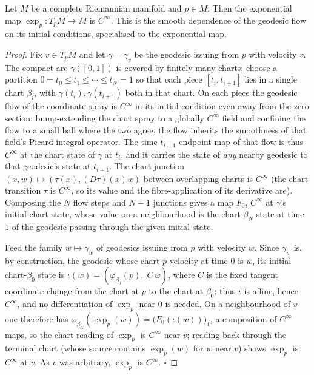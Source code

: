 \begin{lemma}
  \label{lem:dc-ch7-3-expmap-smooth}
  \leanok
  Let $M$ be a complete Riemannian manifold and $p\in M$. Then the exponential map
  $\exp_p:T_pM\to M$ is $C^\infty$. This is the smooth dependence of the geodesic flow on its
  initial conditions, specialised to the exponential map.
\end{lemma}
\begin{proof}
  \leanok
  Fix $v\in T_pM$ and let $\gamma=\gamma_v$ be the geodesic issuing from $p$ with velocity
  $v$. The compact arc $\gamma([0,1])$ is covered by finitely many charts; choose a partition
  $0=t_0\le t_1\le\cdots\le t_N=1$ so that each piece $[t_i,t_{i+1}]$ lies in a single chart
  $\beta_i$, with $\gamma(t_i),\gamma(t_{i+1})$ both in that chart. On each piece the geodesic
  flow of the coordinate spray is $C^\infty$ in its initial condition even away from the zero
  section: bump-extending the chart spray to a globally $C^\infty$ field and confining the
  flow to a small ball where the two agree, the flow inherits the smoothness of that field's
  Picard integral operator. The time-$t_{i+1}$ endpoint map of that flow is thus $C^\infty$ at
  the chart state of $\gamma$ at $t_i$, and it carries the state of \emph{any} nearby geodesic
  to that geodesic's state at $t_{i+1}$. The chart junction $(x,w)\mapsto(\tau(x),(D\tau)(x)w)$
  between overlapping charts is $C^\infty$ (the chart transition $\tau$ is $C^\infty$, so its
  value and the fibre-application of its derivative are). Composing the $N$ flow steps and
  $N-1$ junctions gives a map $F_0$, $C^\infty$ at $\gamma$'s initial chart state, whose value
  on a neighbourhood is the chart-$\beta_N$ state at time $1$ of the geodesic passing through
  the given initial state.

  Feed the family $w\mapsto\gamma_w$ of geodesics issuing from $p$ with velocity $w$. Since
  $\gamma_w$ is, by construction, the geodesic whose chart-$p$ velocity at time $0$ is $w$, its
  initial chart-$\beta_0$ state is $\iota(w)=(\varphi_{\beta_0}(p),\;C\,w)$, where
  $C$ is the fixed tangent coordinate change from the chart at $p$ to the chart at $\beta_0$;
  thus $\iota$ is affine, hence $C^\infty$, and no differentiation of $\exp_p$ near $0$ is
  needed. On a neighbourhood of $v$ one therefore has
  $\varphi_{\beta_N}(\exp_p(w))=\big(F_0(\iota(w))\big)_1$, a composition of $C^\infty$ maps,
  so the chart reading of $\exp_p$ is $C^\infty$ near $v$; reading back through the terminal
  chart (whose source contains $\exp_p(w)$ for $w$ near $v$) shows $\exp_p$ is $C^\infty$ at
  $v$. As $v$ was arbitrary, $\exp_p$ is $C^\infty$. $\square$
\end{proof}

